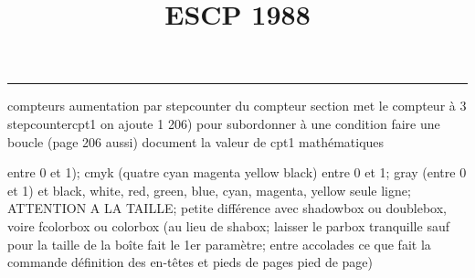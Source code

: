 \documentclass[11pt]{article}%
\title{\bf \vspace{-2cm} ESCP 1988} %
\author{} %
\date{} %
\renewcommand{\headrulewidth}{0pt}%
\renewcommand{\footrulewidth}{0.4pt}%
\begin{document}
\maketitle %
\vspace{-1.4cm}\hrule %
\thispagestyle{fancy}

\vspace*{.2cm}



compteurs%
aumentation par stepcounter du compteur section%
met le compteur à 3%
stepcounter{cpt1} on ajoute 1%
206) pour subordonner à une condition %
faire une boucle (page 206 aussi) %
document la valeur de cpt1 
mathématiques\newcommand{\ch}{\operatorname{ch}} 
\newcommand{\sh}{\operatorname{sh}}
\renewcommand{\tanh}{\operatorname{th}}
\renewcommand{\sinh}{\operatorname{sh}}
\renewcommand{\cosh}{\operatorname{ch}}
\newcommand{\argsh}{\operatorname{argsh}}
\newcommand{\argch}{\operatorname{argch}}
\newcommand{\argth}{\operatorname{argth}}
\newcommand{\ker}{\operatorname{Ker}}
\renewcommand{\im}{\operatorname{Im}}
\newcommand{\rg}{\operatorname{rg}}
\newcommand{\Id}{\operatorname{Id}}
\newcommand{\id}{\operatorname{id}}
\renewcommand{\leq}{\leq}
\renewcommand{\geq}{\geq }

entre 0 et 1); cmyk (quatre cyan magenta yellow black) entre 0 et 1;
gray (entre 0 et 1) et black, white, red, green, blue, cyan, magenta,
yellow%
seule ligne; ATTENTION A LA TAILLE; petite différence avec shadowbox ou
doublebox, voire fcolorbox ou colorbox (au lieu de shabox; laisser le
parbox tranquille sauf pour la taille de la boîte
\newcommand{\Tbox}[1]{\begin{center} \shabox{\parbox{0.6
\linewidth}{#1}} \end{center}} %
fait le 1er paramètre; entre accolades ce que fait la commande
définition des en-têtes et pieds de pages\pagestyle{fancy}
\chead{}
\rfoot[ \ \thepage]{\thepage}
\cfoot{}
\lfoot{}
\thispagestyle{fancy} %
pied de page)\renewcommand{\footrulewidth}{0.4pt}
\renewcommand{\headrulewidth}{0.4pt}
\end{document}
